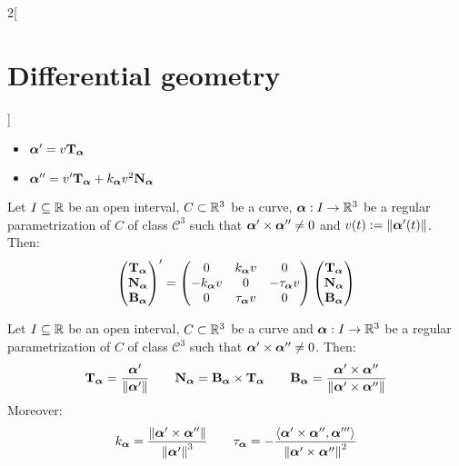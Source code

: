 \documentclass[../../../main.tex]{subfiles}
\begin{document}
\begin{multicols}{2}[\section{Differential geometry}]
\begin{lemma}
    \begin{itemize}
      \item $\vf{\alpha}'=v\T\alpha$
      \item $\vf{\alpha}''=v'\T\alpha+k_{\vf\alpha} v^2\N\alpha$
    \end{itemize}
  \end{lemma}
  \begin{theorem}
    Let $I\subseteq\RR$ be an open interval, $C\subset\RR^3$ be a curve, $\vf{\alpha}:I\rightarrow\RR^3$ be a regular parametrization of $C$ of class $\mathcal{C}^3$ such that $\vf{\alpha}'\times \vf{\alpha}''\ne 0$ and $v(t):=\|\vf{\alpha}'(t)\|$. Then:
    $$
      \begin{pmatrix}
        \T\alpha \\
        \N\alpha \\
        \B\alpha \\
      \end{pmatrix}'=
      \begin{pmatrix}
        0                & k_{\vf\alpha} v & 0            \\
        -k_{\vf\alpha} v & 0               & -\ta\alpha v \\
        0                & \ta\alpha v     & 0
      \end{pmatrix}
      \begin{pmatrix}
        \T\alpha \\
        \N\alpha \\
        \B\alpha \\
      \end{pmatrix}
    $$
  \end{theorem}
  \begin{corollary}
    Let $I\subseteq\RR$ be an open interval, $C\subset\RR^3$ be a curve and $\vf{\alpha}:I\rightarrow\RR^3$ be a regular parametrization of $C$ of class $\mathcal{C}^3$ such that $\vf{\alpha}'\times \vf{\alpha}''\ne 0$. Then:
    $$\T\alpha=\frac{\vf{\alpha}'}{\|\vf{\alpha}'\|}\qquad\N\alpha=\B\alpha\times\T\alpha\qquad\B\alpha=\frac{\vf{\alpha}'\times\vf{\alpha}''}{\|\vf{\alpha}'\times\vf{\alpha}''\|}$$
    Moreover: $$k_{\vf\alpha}=\frac{\|\vf{\alpha}'\times\vf{\alpha}''\|}{{\|\vf{\alpha}'\|}^3}\qquad\ta\alpha=-\frac{\langle\vf{\alpha}'\times\vf{\alpha}'',\vf{\alpha}'''\rangle}{{\|\vf{\alpha}'\times\vf{\alpha}''\|}^2}$$
  \end{corollary}

\end{multicols}
\end{document}
